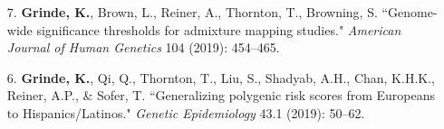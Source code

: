 \documentclass[margin]{res}
\begin{document}
\begin{resume}
\begin{itemize}
\item[7.] \textbf{Grinde, K.}, Brown, L., Reiner, A., Thornton, T., Browning, S. ``Genome-wide significance thresholds for admixture mapping studies." \textit{American Journal of Human Genetics} 104 (2019): 454--465. 

\item[6.] \textbf{Grinde, K.}, Qi, Q., Thornton, T., Liu, S., Shadyab, A.H., Chan, K.H.K., Reiner, A.P., \& Sofer, T. ``Generalizing polygenic risk scores from Europeans to Hispanics/Latinos." \textit{Genetic Epidemiology} 43.1 (2019): 50--62. 
 

\end{itemize}
\end{resume}
\end{document}
